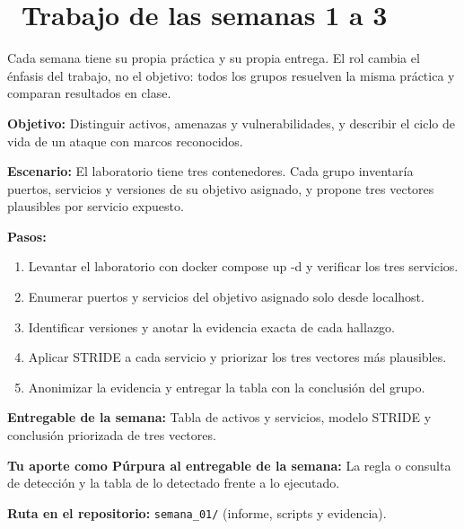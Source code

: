 \documentclass[11pt,a4paper]{article}
\newcommand{\iconotexto}[2]{\textcolor{cyanNeon}{\faIcon{#1}}~#2}
\begin{document}
\section{\iconotexto{calendar-alt}{Trabajo de las semanas 1 a 3}}

Cada semana tiene su propia práctica y su propia entrega. El rol cambia el énfasis del trabajo, no el objetivo: todos los grupos resuelven la misma práctica y comparan resultados en clase.

\begin{tcolorbox}[cajaContenido,title={Semana 1 --- Inventario de superficie de ataque del laboratorio}]
\textbf{Objetivo:} Distinguir activos, amenazas y vulnerabilidades, y describir el ciclo de vida de un ataque con marcos reconocidos.

\textbf{Escenario:} El laboratorio tiene tres contenedores. Cada grupo inventaría puertos, servicios y versiones de su objetivo asignado, y propone tres vectores plausibles por servicio expuesto.


\textbf{Pasos:}
\begin{enumerate}[leftmargin=1.4em,itemsep=2pt,topsep=3pt]
  \item Levantar el laboratorio con docker compose up -d y verificar los tres servicios.
  \item Enumerar puertos y servicios del objetivo asignado solo desde localhost.
  \item Identificar versiones y anotar la evidencia exacta de cada hallazgo.
  \item Aplicar STRIDE a cada servicio y priorizar los tres vectores más plausibles.
  \item Anonimizar la evidencia y entregar la tabla con la conclusión del grupo.
\end{enumerate}
\textbf{Entregable de la semana:} Tabla de activos y servicios, modelo STRIDE y conclusión priorizada de tres vectores.

\textbf{Tu aporte como Púrpura al entregable de la semana:} La regla o consulta de detección y la tabla de lo detectado frente a lo ejecutado.

\textbf{Ruta en el repositorio:} \texttt{semana\_01/} (informe, scripts y evidencia).
\end{tcolorbox}
\end{document}
